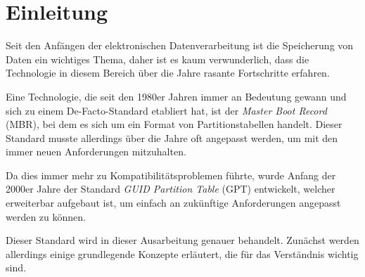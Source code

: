 \section{Einleitung}
Seit den Anfängen der elektronischen Datenverarbeitung ist die Speicherung von Daten ein wichtiges Thema, daher ist es kaum verwunderlich, dass die Technologie in diesem Bereich über die Jahre rasante Fortschritte erfahren.

Eine Technologie, die seit den 1980er Jahren immer an Bedeutung gewann und sich zu einem De-Facto-Standard etabliert hat, ist der \textit{Master Boot Record} (MBR), bei dem es sich um ein Format von Partitionstabellen handelt.
Dieser Standard musste allerdings über die Jahre oft angepasst werden, um mit den immer neuen Anforderungen mitzuhalten.

Da dies immer mehr zu Kompatibilitätsproblemen führte, wurde Anfang der 2000er Jahre der Standard \textit{GUID Partition Table} (GPT) entwickelt, welcher erweiterbar aufgebaut ist, um einfach an zukünftige Anforderungen angepasst werden zu können.

Dieser Standard wird in dieser Ausarbeitung genauer behandelt.
Zunächst werden allerdings einige grundlegende Konzepte erläutert, die für das Verständnis wichtig sind.
